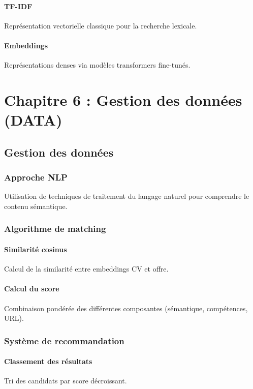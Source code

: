 \documentclass[12pt,a4paper]{report}
\begin{document}
\subsection{TF-IDF}
Représentation vectorielle classique pour la recherche lexicale.

\subsection{Embeddings}
Représentations denses via modèles transformers fine-tunés.

\part{Chapitre 6 : Gestion des données (DATA)}
\chapter{Gestion des données}

\section{Approche NLP}
Utilisation de techniques de traitement du langage naturel pour comprendre le contenu sémantique.

\section{Algorithme de matching}

\subsection{Similarité cosinus}
Calcul de la similarité entre embeddings CV et offre.

\subsection{Calcul du score}
Combinaison pondérée des différentes composantes (sémantique, compétences, URL).

\section{Système de recommandation}

\subsection{Classement des résultats}
Tri des candidats par score décroissant.
\end{document}
